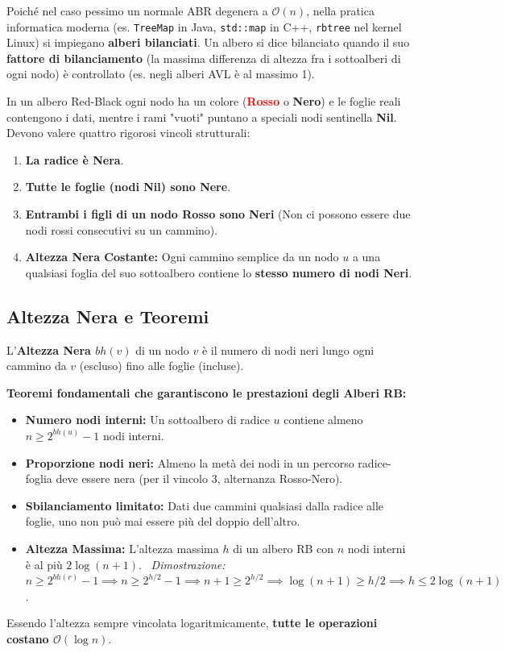 \documentclass[12pt, a4paper]{article}
\begin{document}
Poiché nel caso pessimo un normale ABR degenera a $\mathcal{O}(n)$, nella pratica informatica moderna (es. \texttt{TreeMap} in Java, \texttt{std::map} in C++, \texttt{rbtree} nel kernel Linux) si impiegano \textbf{alberi bilanciati}.
Un albero si dice bilanciato quando il suo \textbf{fattore di bilanciamento} (la massima differenza di altezza fra i sottoalberi di ogni nodo) è controllato (es. negli alberi AVL è al massimo 1).

\begin{tcolorbox}[colback=lightergray!10, colframe=tocsec, title=\textbf{Definizione e Regole degli Alberi Red-Black (RB)}]
In un albero Red-Black ogni nodo ha un colore (\textcolor{red}{\textbf{Rosso}} o \textbf{Nero}) e le foglie reali contengono i dati, mentre i rami "vuoti" puntano a speciali nodi sentinella \textbf{Nil}. Devono valere quattro rigorosi vincoli strutturali:
\begin{enumerate}
\item \textbf{La radice è Nera}.
\item \textbf{Tutte le foglie (nodi Nil) sono Nere}.
\item \textbf{Entrambi i figli di un nodo Rosso sono Neri} (Non ci possono essere due nodi rossi consecutivi su un cammino).
\item \textbf{Altezza Nera Costante:} Ogni cammino semplice da un nodo $u$ a una qualsiasi foglia del suo sottoalbero contiene lo \textbf{stesso numero di nodi Neri}.
\end{enumerate}
\end{tcolorbox}

\subsection{Altezza Nera e Teoremi}
L'\textbf{Altezza Nera $bh(v)$} di un nodo $v$ è il numero di nodi neri lungo ogni cammino da $v$ (escluso) fino alle foglie (incluse).

\textbf{Teoremi fondamentali che garantiscono le prestazioni degli Alberi RB:}
\begin{itemize}
\item \textbf{Numero nodi interni:} Un sottoalbero di radice $u$ contiene almeno $n \ge 2^{bh(u)} - 1$ nodi interni.
\item \textbf{Proporzione nodi neri:} Almeno la metà dei nodi in un percorso radice-foglia deve essere nera (per il vincolo 3, alternanza Rosso-Nero).
\item \textbf{Sbilanciamento limitato:} Dati due cammini qualsiasi dalla radice alle foglie, uno non può mai essere più del doppio dell'altro.
\item \textbf{Altezza Massima:} L'altezza massima $h$ di un albero RB con $n$ nodi interni è al più $2 \log(n+1)$. \
\textit{Dimostrazione:} $n \ge 2^{bh(r)} - 1 \implies n \ge 2^{h/2} - 1 \implies n+1 \ge 2^{h/2} \implies \log(n+1) \ge h/2 \implies h \le 2\log(n+1)$.
\end{itemize}
Essendo l'altezza sempre vincolata logaritmicamente, \textbf{tutte le operazioni costano $\mathcal{O}(\log n)$}.
\end{document}
